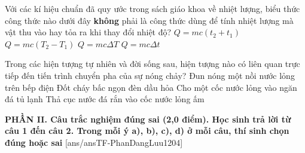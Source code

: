 \begin{ex}	Với các kí hiệu chuẩn đã quy ước trong sách giáo khoa về nhiệt lượng, biểu thức công thức nào dưới đây \textbf{không} phải là công thức dùng để tính nhiệt lượng mà vật thu vào hay tỏa ra khi thay đổi nhiệt độ?
	\choice
	{\True $Q=m c\left(t_{2}+t_{1}\right)$}
	{$Q=m c\left(T_{2}-T_{1}\right)$}
	{$Q=m c \Delta T$}
	{$Q=m c \Delta t$}
\end{ex}

\begin{ex}	Trong các hiện tượng tự nhiên và đời sống sau, hiện tượng nào có liên quan trực tiếp đến tiến trình chuyển pha của sự nóng chảy?
	\choice
	{Đun nóng một nồi nước lỏng trên bếp điện}
	{Đốt cháy bấc ngọn đèn dầu hỏa}
	{Cho một cốc nước lỏng vào ngăn đá tủ lạnh}
	{\True Thả cục nước đá rắn vào cốc nước lỏng ấm}
\end{ex}


\noindent \textbf{PHẦN II. Câu trắc nghiệm đúng sai (2,0 điểm). Học sinh trả lời từ câu 1 đến câu 2. Trong mỗi ý a), b), c), d) ở mỗi câu, thí sinh chọn đúng hoặc sai}
[ans/ansTF-PhanDangLuu1204]

